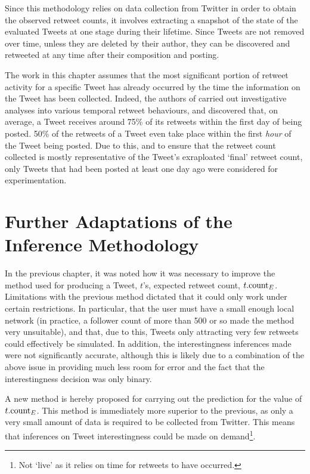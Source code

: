 Since this methodology relies on data collection from Twitter in order to obtain the observed retweet counts, it involves extracting a snapshot of the state of the evaluated Tweets at one stage during their lifetime. Since Tweets are not removed over time, unless they are deleted by their author, they can be discovered and retweeted at any time after their composition and posting.

The work in this chapter assumes that the most significant portion of retweet activity for a specific Tweet has already occurred by the time the information on the Tweet has been collected. Indeed, the authors of \cite{kwak10} carried out investigative analyses into various temporal retweet behaviours, and discovered that, on average, a Tweet receives around 75\% of its retweets within the first day of being posted. 50\% of the retweets of a Tweet even take place within the first \textit{hour} of the Tweet being posted. Due to this, and to ensure that the retweet count collected is mostly representative of the Tweet's exraploated `final' retweet count, only Tweets that had been posted at least one day ago were considered for experimentation.


\section{Further Adaptations of the Inference Methodology}
In the previous chapter, it was noted how it was necessary to improve the method used for producing a Tweet, $t$'s, expected retweet count, $t.\textrm{count}_E$. Limitations with the previous method dictated that it could only work under certain restrictions. In particular, that the user must have a small enough local network (in practice, a follower count of more than 500 or so made the method very unsuitable), and that, due to this, Tweets only attracting very few retweets could effectively be simulated. In addition, the interestingness inferences made were not significantly accurate, although this is likely due to a combination of the above issue in providing much less room for error and the fact that the interestingness decision was only binary.

A new method is hereby proposed for carrying out the prediction for the value of $t.\textrm{count}_E$. This method is immediately more superior to the previous, as only a very small amount of data is required to be collected from Twitter. This means that inferences on Tweet interestingness could be made on demand\footnote{Not `live' as it relies on time for retweets to have occurred.}.

